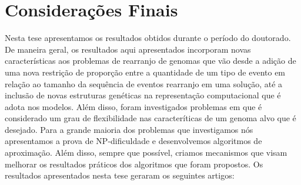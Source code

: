 \chapter{Considerações Finais}\label{chapter:IXYEIWKC}

Nesta tese apresentamos os resultados obtidos durante o período do doutorado. De maneira geral, os resultados aqui apresentados incorporam novas características aos problemas de rearranjo de genomas que vão desde a adição de uma nova restrição de proporção entre a quantidade de um tipo de evento em relação ao tamanho da sequência de eventos rearranjo em uma solução, até a inclusão de novas estruturas genéticas na representação computacional que é adota nos modelos. Além disso, foram investigados problemas em que é considerado um grau de flexibilidade nas caracteríticas de um genoma alvo que é desejado. Para a grande maioria dos problemas que investigamos nós apresentamos a prova de NP-dificuldade e desenvolvemos algoritmos de aproximação. Além disso, sempre que possível, criamos mecanismos que visam melhorar os resultados práticos dos algoritmos que foram propostos. Os resultados apresentados nesta tese geraram os seguintes artigos:

